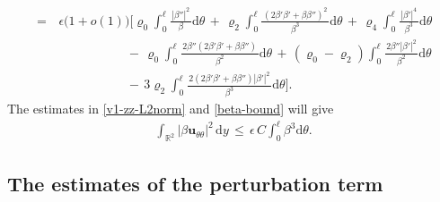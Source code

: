 \documentclass[10pt, reqno]{amsart}
\numberwithin{equation}{section}
\theoremstyle{definition}
\begin{document}
{{\begin{align}
\nonumber\\[2mm]
 \,=\,
 &\epsilon \big(1+o(1)\big)
 \Bigg[
 \varrho_0\int_0^{\ell}\frac{\, |\beta''|^2\, }{\beta} {\mathrm d}\theta
 \,+\,
 \varrho_2\int_0^{\ell}\frac{\, (2\beta'\beta'+\beta\beta'')^2\, }{\beta^3} {\mathrm d}\theta
 \,+\,
 \varrho_4\int_0^{\ell}\frac{\,|\beta'|^4\, }{\beta^3} {\mathrm d}\theta
\nonumber\\[2mm]
 &\qquad\qquad\quad\
 \,-\,
 \varrho_0\int_0^{\ell}\frac{\, 2\beta''(2\beta'\beta'+\beta\beta'')\, }{\beta^2} {\mathrm d}\theta
 \,+\,
 (\varrho_0-\varrho_2)\int_0^{\ell}\frac{\, 2\beta''|\beta'|^2\, }{\beta^2} {\mathrm d}\theta
\nonumber\\[2mm]
 &\qquad\qquad\quad\
 \,-\,
 3\varrho_2\int_0^{\ell}\frac{\, 2(2\beta'\beta'+\beta\beta'')|\beta'|^2\, }{\beta^3} {\mathrm d}\theta
 \Bigg].
 \label{v1-zz-L2norm}
\end{align}
 The estimates in \eqref{v1-zz-L2norm} and \eqref{beta-bound} will give
\begin{align}
 \int_{{\mathbb R}^2} |\beta {\mathbf u}_{\theta\theta}|^2 \,{\mathrm d} y
 \,\leq\,
 \epsilon\,C \int_0^{\ell}\beta^3 {\mathrm d}\theta.
 \label{v1-zz-L2norm-1}
\end{align}







\subsection{ The estimates  of the perturbation term} \label{Section4.3}\



}}
\end{document}

